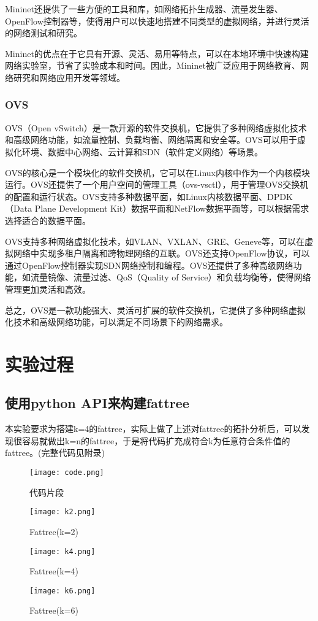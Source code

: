 \documentclass{xjtureport}
\begin{document}
Mininet还提供了一些方便的工具和库，如网络拓扑生成器、流量发生器、OpenFlow控制器等，使得用户可以快速地搭建不同类型的虚拟网络，并进行灵活的网络测试和研究。

Mininet的优点在于它具有开源、灵活、易用等特点，可以在本地环境中快速构建网络实验室，节省了实验成本和时间。因此，Mininet被广泛应用于网络教育、网络研究和网络应用开发等领域。
\subsubsection{OVS}
OVS（Open vSwitch）是一款开源的软件交换机，它提供了多种网络虚拟化技术和高级网络功能，如流量控制、负载均衡、网络隔离和安全等。OVS可以用于虚拟化环境、数据中心网络、云计算和SDN（软件定义网络）等场景。

OVS的核心是一个模块化的软件交换机，它可以在Linux内核中作为一个内核模块运行。OVS还提供了一个用户空间的管理工具（ovs-vsctl），用于管理OVS交换机的配置和运行状态。OVS支持多种数据平面，如Linux内核数据平面、DPDK（Data Plane Development Kit）数据平面和NetFlow数据平面等，可以根据需求选择适合的数据平面。

OVS支持多种网络虚拟化技术，如VLAN、VXLAN、GRE、Geneve等，可以在虚拟网络中实现多租户隔离和跨物理网络的互联。OVS还支持OpenFlow协议，可以通过OpenFlow控制器实现SDN网络控制和编程。OVS还提供了多种高级网络功能，如流量镜像、流量过滤、QoS（Quality of Service）和负载均衡等，使得网络管理更加灵活和高效。

总之，OVS是一款功能强大、灵活可扩展的软件交换机，它提供了多种网络虚拟化技术和高级网络功能，可以满足不同场景下的网络需求。
\section{实验过程}
\subsection{使用python API来构建fattree}
本实验要求为搭建k=4的fattree，实际上做了上述对fattree的拓扑分析后，可以发现很容易就做出k=n的fattree，于是将代码扩充成符合k为任意符合条件值的fattree。(完整代码见附录)
\begin{figure}[H]
	\centering
	\texttt{[image: code.png]}
	\caption{代码片段}
\end{figure}
\begin{figure}[H]
	\centering
	\texttt{[image: k2.png]}
	\caption{Fattree(k=2)}
\end{figure}
\begin{figure}[H]
	\centering
	\texttt{[image: k4.png]}
	\caption{Fattree(k=4)}
\end{figure}
\begin{figure}[H]
	\centering
	\texttt{[image: k6.png]}
	\caption{Fattree(k=6)}
\end{figure}
\end{document}
